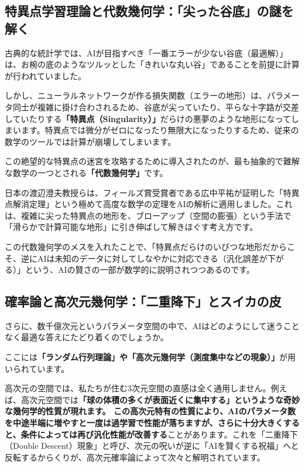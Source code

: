 \subsection{特異点学習理論と代数幾何学：「尖った谷底」の謎を解く}

古典的な統計学では、AIが目指すべき「一番エラーが少ない谷底（最適解）」は、お椀の底のようなツルッとした「きれいな丸い谷」であることを前提に計算が行われていました。

しかし、ニューラルネットワークが作る損失関数（エラーの地形）は、パラメータ同士が複雑に掛け合わされるため、谷底が尖っていたり、平らな十字路が交差していたりする\textbf{「特異点（Singularity）」}だらけの悪夢のような地形になってしまいます。特異点では微分がゼロになったり無限大になったりするため、従来の数学のツールでは計算が崩壊してしまいます。

この絶望的な特異点の迷宮を攻略するために導入されたのが、最も抽象的で難解な数学の一つとされる\textbf{「代数幾何学」}です。

日本の渡辺澄夫教授らは、フィールズ賞受賞者である広中平祐が証明した「特異点解消定理」という極めて高度な数学の定理をAIの解析に適用しました。これは、複雑に尖った特異点の地形を、ブローアップ（空間の膨張）という手法で「滑らかで計算可能な地形」に引き伸ばして解きほぐす考え方です。

この代数幾何学のメスを入れたことで、「特異点だらけのいびつな地形だからこそ、逆にAIは未知のデータに対してしなやかに対応できる（汎化誤差が下がる）」という、AIの賢さの一部が数学的に説明されつつあるのです。

\subsection{確率論と高次元幾何学：「二重降下」とスイカの皮}

さらに、数千億次元というパラメータ空間の中で、AIはどのようにして迷うことなく最適な答えにたどり着くのでしょうか。

ここには\textbf{「ランダム行列理論」や「高次元幾何学（測度集中などの現象）」}が用いられています。

高次元の空間では、私たちが住む3次元空間の直感は全く通用しません。例えば、高次元空間では\textbf{「球の体積の多くが表面近くに集中する」というような奇妙な幾何学的性質が現れます。 この高次元特有の性質により、AIのパラメータ数を中途半端に増やすと一度は過学習で性能が落ちますが、さらに十分大きくすると、条件によっては再び汎化性能が改善する}ことがあります。これを「二重降下（Double Descent）現象」と呼び、次元の呪いが逆に「AIを賢くする祝福」へと反転するからくりが、高次元確率論によって次々と解明されています。


